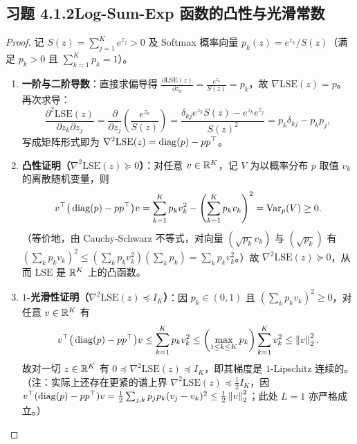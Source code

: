 \subsection*{习题 4.1.2\quad Log-Sum-Exp 函数的凸性与光滑常数}
\begin{proof}
记 $S(z) = \sum_{j=1}^K e^{z_j} > 0$ 及 Softmax 概率向量 $p_k(z) = e^{z_k} / S(z)$（满足 $p_k > 0$ 且 $\sum_{k=1}^K p_k = 1$）。
\begin{enumerate}[label=(\arabic*), leftmargin=1.8em]
  \item \textbf{一阶与二阶导数}：直接求偏导得 $\frac{\partial \mathrm{LSE}(z)}{\partial z_k} = \frac{e^{z_k}}{S(z)} = p_k$，故 $\nabla \mathrm{LSE}(z) = p$。再次求导：
  \[
    \frac{\partial^2 \mathrm{LSE}(z)}{\partial z_k \partial z_j}
    = \frac{\partial}{\partial z_j}\!\left(\frac{e^{z_k}}{S(z)}\right)
    = \frac{\delta_{kj} e^{z_k} S(z) - e^{z_k} e^{z_j}}{S(z)^2}
    = p_k \delta_{kj} - p_k p_j,
  \]
  写成矩阵形式即为 $\nabla^2 \mathrm{LSE}(z) = \operatorname{diag}(p) - p p^\top$。

  \item \textbf{凸性证明（$\nabla^2 \mathrm{LSE}(z) \succeq 0$）}：对任意 $v \in \mathbb{R}^K$，记 $V$ 为以概率分布 $p$ 取值 $v_k$ 的离散随机变量，则
  \[
    v^\top \big(\operatorname{diag}(p) - p p^\top\big) v
    = \sum_{k=1}^K p_k v_k^2 - \left(\sum_{k=1}^K p_k v_k\right)^2
    = \operatorname{Var}_{p}(V) \ge 0.
  \]
  （等价地，由 Cauchy-Schwarz 不等式，对向量 $(\sqrt{p_k} v_k)$ 与 $(\sqrt{p_k})$ 有 $(\sum_k p_k v_k)^2 \le (\sum_k p_k v_k^2)(\sum_k p_k) = \sum_k p_k v_k^2$。）故 $\nabla^2 \mathrm{LSE}(z) \succeq 0$，从而 $\mathrm{LSE}$ 是 $\mathbb{R}^K$ 上的凸函数。

  \item \textbf{$1$-光滑性证明（$\nabla^2 \mathrm{LSE}(z) \preceq I_K$）}：因 $p_k \in (0, 1)$ 且 $(\sum_k p_k v_k)^2 \ge 0$，对任意 $v \in \mathbb{R}^K$ 有
  \[
    v^\top \big(\operatorname{diag}(p) - p p^\top\big) v
    \le \sum_{k=1}^K p_k v_k^2
    \le \left(\max_{1\le k\le K} p_k\right)\sum_{k=1}^K v_k^2
    \le \left\|v\right\|_2^2.
  \]
  故对一切 $z \in \mathbb{R}^K$ 有 $0 \preceq \nabla^2 \mathrm{LSE}(z) \preceq I_K$，即其梯度是 $1$-Lipschitz 连续的。（注：实际上还存在更紧的谱上界 $\nabla^2 \mathrm{LSE}(z) \preceq \frac{1}{2}I_K$，因 $v^\top(\operatorname{diag}(p)-pp^\top)v = \frac{1}{2}\sum_{j,k} p_j p_k(v_j-v_k)^2 \le \frac{1}{2}\left\|v\right\|_2^2$；此处 $L=1$ 亦严格成立。）\qedhere
\end{enumerate}
\end{proof}


